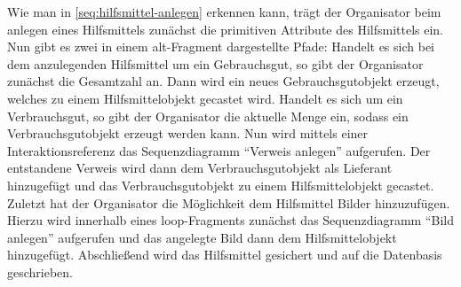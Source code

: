 Wie man in \autoref{seq:hilfsmittel-anlegen} erkennen kann, trägt der Organisator beim anlegen eines Hilfsmittels zunächst die primitiven Attribute des Hilfsmittels ein. Nun gibt es zwei in einem alt-Fragment dargestellte Pfade: Handelt es sich bei dem anzulegenden Hilfsmittel um ein Gebrauchsgut, so gibt der Organisator zunächst die Gesamtzahl an. Dann wird ein neues Gebrauchsgutobjekt erzeugt, welches zu einem Hilfsmittelobjekt gecastet wird. Handelt es sich um ein Verbrauchsgut, so gibt der Organisator die aktuelle Menge ein, sodass ein Verbrauchsgutobjekt erzeugt werden kann. Nun wird mittels einer Interaktionsreferenz das Sequenzdiagramm \enquote{Verweis anlegen} aufgerufen. Der entstandene Verweis wird dann dem Verbrauchsgutobjekt als Lieferant hinzugefügt und das Verbrauchsgutobjekt zu einem Hilfsmittelobjekt gecastet. Zuletzt hat der Organisator die Möglichkeit dem Hilfsmittel Bilder hinzuzufügen. Hierzu wird innerhalb eines loop-Fragments zunächst das Sequenzdiagramm \enquote{Bild anlegen} aufgerufen und das angelegte Bild dann dem Hilfsmittelobjekt hinzugefügt. Abschließend wird das Hilfsmittel gesichert und auf die Datenbasis geschrieben. 
